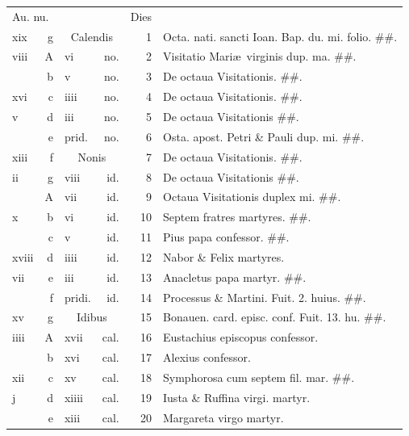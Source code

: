 \documentclass[a5paper,10pt]{book}
\def\ae{æ}
\begin{document}
\begin{center}
\begin{tabular}{l r l r r l}
\multicolumn{2}{l}{\color{red}Au. nu.} & & & \color{red} Dies & \\
xix & g & \multicolumn{2}{c}{\color{red} Calendis} & 1 & Octa. nati. sancti Ioan. Bap. du. mi. \color{black} folio. \#\#.\\
viii & \color{red} A & vi & no. & 2 & \color{red} Visitatio Mari\ae \ virginis dup. ma. \color{black} \#\#.\\
 & b & v & no. & 3 & De octaua Visitationis. \color{black} \#\#.\\
xvi & c & iiii & no. & 4 & De octaua Visitationis. \color{black} \#\#.\\
v & d & iii & no. & 5 & De octaua Visitationis \color{black} \#\#.\\
 & e & \color{red} prid. & no. & 6 & Osta. apost. Petri \& Pauli dup. mi. \color{black} \#\#.\\
xiii & f & \multicolumn{2}{c}{\color{red} Nonis} & 7 & De octaua Visitationis. \#\#.\\
ii & g & viii & id. & 8 & De octaua Visitationis \color{black} \#\#.\\
 & \color{red} A & vii & id. & 9 & Octaua Visitationis duplex mi. \color{black} \#\#.\\
x & b & vi & id. & 10 & Septem fratres martyres. \color{black} \#\#.\\
 & c & v & id. & 11 & Pius papa confessor. \#\#.\\
xviii & d & iiii & id. & 12 & Nabor \& Felix martyres. \color{black}\\
vii & e & iii & id. & 13 & Anacletus papa martyr. \#\#.\\
 & f & \color{red} pridi. & id. & 14 & Processus \& Martini. \color{red} Fuit. 2. huius. \color{black} \#\#.\\
xv & g & \multicolumn{2}{c}{\color{red} Idibus} & 15 & Bonauen. card. episc. conf. \color{red} Fuit. 13. hu. \color{black} \#\#.\\
iiii & \color{red} A & xvii & cal. & 16 & Eustachius episcopus confessor. \\
 & b & xvi & cal. & 17 & Alexius confessor. \\
xii & c & xv & cal. & 18 & Symphorosa cum septem fil. mar. \#\#.\\
j & d & xiiii & cal. & 19 & Iusta \& Ruffina virgi. martyr. \\
 & e & xiii & cal. & 20 & Margareta virgo martyr. \\

\end{tabular}
\end{center}
\end{document}
